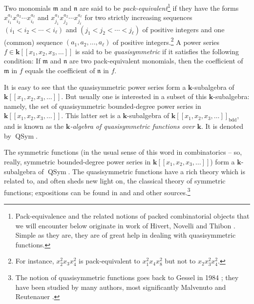 \documentclass[numbers=enddot,12pt,final,onecolumn,notitlepage,abstracton]{scrartcl}
\theoremstyle{definition}
\newcommand{\kk}{{\mathbf{k}}}
\newcommand{\QSym}{{\operatorname{QSym}}}
\newcommand{\Powser}{\mathbf{k}\left[\left[x_1,x_2,x_3,\ldots\right]\right]}
\newcommand{\bdd}{\operatorname{bdd}}
\begin{document}
Two monomials $\mathfrak{m}$ and $\mathfrak{n}$ are said to be
\textit{pack-equivalent}\footnote{Pack-equivalence and the related
notions of packed combinatorial objects that we will encounter below
originate in work of Hivert, Novelli and Thibon
\cite{Nov-Thi}. Simple as they are, they are of great help in dealing
with quasisymmetric functions.} if they have the forms
$x_{i_1}^{a_1} x_{i_2}^{a_2} \cdots x_{i_\ell}^{a_\ell}$ and
$x_{j_1}^{a_1} x_{j_2}^{a_2} \cdots x_{j_\ell}^{a_\ell}$ for two
strictly increasing sequences
$\left(i_1 < i_2 < \cdots < i_\ell\right)$
and $\left(j_1 < j_2 < \cdots < j_\ell\right)$ of positive integers and
one (common) sequence $\left(a_1, a_2, \ldots, a_\ell\right)$ of
positive integers.\footnote{For instance, $x_2^2 x_3 x_4^2$ is
pack-equivalent to $x_1^2 x_4 x_8^2$ but not to $x_2 x_3^2 x_4^2$.}
A power series $f \in \Powser$ is said to be \textit{quasisymmetric}
if it satisfies the following condition:
If $\mathfrak{m}$ and $\mathfrak{n}$ are two pack-equivalent
monomials, then the coefficient of $\mathfrak{m}$ in $f$ equals
the coefficient of $\mathfrak{n}$ in $f$.

It is easy to see that the quasisymmetric
power series form a $\kk$-subalgebra of $\Powser$. But usually one
is interested in a subset of this $\kk$-subalgebra: namely,
the set of quasisymmetric bounded-degree power
series in $\Powser$.
This latter set is a $\kk$-subalgebra of $\Powser_{\bdd}$, and
is known as the \textit{$\kk$-algebra of quasisymmetric functions
over $\kk$}. It is denoted by $\QSym$.

The symmetric functions (in the
usual sense of this word in combinatorics -- so, really, symmetric
bounded-degree power series in $\Powser$) form a $\kk$-subalgebra
of $\QSym$. The quasisymmetric functions have a rich theory which
is related to, and often sheds new light on, the classical theory of
symmetric functions; expositions can be found in
\cite[\S\S 7.19, 7.23]{Stanley-EC2} and \cite[\S\S 5-6]{Reiner} and
other sources.\footnote{The notion of quasisymmetric functions goes
back to Gessel in 1984 \cite{Gessel}; they have been studied by many
authors, most significantly Malvenuto and Reutenauer
\cite{Mal-Reu-dua}.}
\end{document}

